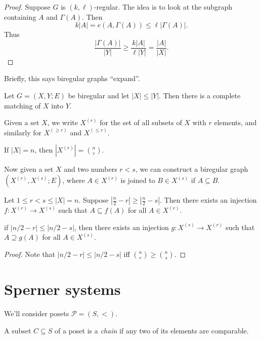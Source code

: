 \documentclass[a4paper]{article}
\begin{document}
\begin{proof}
  Suppose $G$ is $(k, \ell)$-regular. The idea is to look at the subgraph containing $A$ and $\Gamma(A)$. Then
  \[
    k|A| = e(A, \Gamma(A)) \leq \ell |\Gamma(A)|.
  \]
  Thus
  \[
    \frac{|\Gamma(A)|}{|Y|} \geq \frac{k|A|}{\ell |Y|} = \frac{|A|}{|X|}.
  \]
\end{proof}
Briefly, this says biregular graphs ``expand''.

\begin{cor}
  Let $G = (X, Y; E)$ be biregular and let $|X| \leq |Y|$. Then there is a complete matching of $X$ into $Y$.
\end{cor}

\begin{notation}
  Given a set $X$, we write $X^{(r)}$ for the set of all subsets of $X$ with $r$ elements, and similarly for $X^{(\geq r)}$ and $X^{(\leq r)}$.
\end{notation}

If $|X| = n$, then $|X^{(r)}| = \binom{n}{r}$.

Now given a set $X$ and two numbers $r < s$, we can construct a biregular graph $(X^{(r)}, X^{(s)}; E)$, where $A \in X^{(r)}$ is joined to $B \in X^{(s)}$ if $A \subseteq B$.

\begin{cor}
  Let $1 \leq r < s \leq |X| = n$. Suppose $|\frac{n}{2} -r | \geq |\frac{n}{2} - s|$. Then there exists an injection $f: X^{(r)} \to X^{(s)}$ such that $A \subseteq f(A)$ for all $A \in X^{(r)}$.

  if $|n/2 - r| \leq |n/2 - s|$, then there exists an injection $g: X^{(s)} \to X^{(r)}$ such that $A \supseteq g(A)$ for all $A \in X^{(s)}$.
\end{cor}

\begin{proof}
  Note that $|n/2 - r| \leq |n/2 - s|$ iff $\binom{n}{r} \geq \binom{n}{s}$.
\end{proof}

\section{Sperner systems}
We'll consider posets $\mathcal{P} = (S, <)$.
\begin{defi}[Chain]
  A subset $C \subseteq S$ of a poset is a \emph{chain} if any two of its elements are comparable.
\end{defi}
\end{document}
